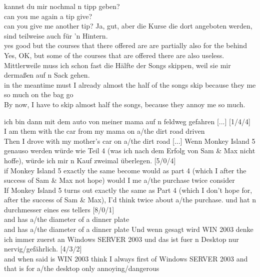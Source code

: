 \begin{exe}
\ex\label{ex:007}
	\begin{xlist}
	\ex\label{ex:0012}\gll kannst du mir nochmal n tipp geben?\\
	can you me again a tip give?\\
	\trans can you give me another tip?
	\ex\label{ex:0013}\gll Ja, gut, aber die Kurse die dort angeboten werden, sind teilweise auch für 'n Hintern.\\
	yes good but the courses that there offered are are partially also for the behind\\
	\trans Yes, OK, but some of the courses that are offered there are also useless.
	\ex\label{ex:0014}\gll Mittlerweile muss ich schon fast die Hälfte der Songs skippen, weil sie mir dermaßen auf n Sack gehen.\\
	{in the meantime} must I already almost the half {of the} songs skip because they me {so much} on the bag go\\
	By now, I have to skip almost half the songs, because they annoy me so much.
	\end{xlist}
\ex\label{ex:008}
	\begin{xlist}
	\ex\label{ex:0015}\gll ich bin dann mit dem auto von meiner mama auf n feldweg gefahren [...] [1/4/4]\\
	I am them with the car from my mama on a/the {dirt road} driven {} {}\\
	\trans Then I drove with my mother's car on a/the dirt road [...]
	\ex\label{ex:0016}\gll Wenn Monkey Island 5 genauso werden würde wie Teil 4 (was ich nach dem Erfolg von Sam \& Max nicht hoffe), würde ich mir n Kauf zweimal überlegen. [5/0/4]\\
	if Monkey Island 5 {exactly the same} become would as part 4 (which I after the success of Sam \& Max not hope) would I me a/the purchase twice consider\\
	\trans If Monkey Island 5 turns out exactly the same as Part 4 (which I don't hope for, after the success of Sam \& Max), I'd think twice about a/the purchase.
	\ex\label{ex:0017}\gll und hat n durchmesser eines {ess tellers} [8/0/1]\\
	and has a/the diameter {of a} {dinner plate}\\
	\trans and has a/the diameter of a dinner plate
	\ex\label{ex:0018}\gll Und wenn gesagt wird WIN 2003 denke ich immer zuerst an Windows SERVER 2003 und das ist fuer n Desktop nur nervig/gefährlich. [4/3/2]\\
	and when said is WIN 2003 think I always first of Windows SERVER 2003 and that is for a/the desktop only annoying/dangerous\\

\end{xlist}
\end{exe}
